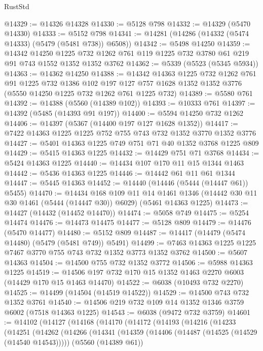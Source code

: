 \begin{lexlean}{RustStd}
\begin{coremodule}
@14329 := @14326 @14328
@14330 := @5128 @798
@14332 := @14329 (@5470 @14330)
@14333 := @5152 @798
@14341 := @14281 (@14286 (@14332 (@5474 @14333) (@5479 (@5481 @738)) @6508))
@14342 := @5498 @14250
@14359 := @14342
    @14250
    @1225
    @732
    @1262
    @761
    @119
    @1225
    @732
    @3780
    @61
    @219
    @91
    @743
    @1552
    @1352
    @1352
    @3762
@14362 := @5339 (@5523 (@5345 @5934))
@14363 := @14362 @14250
@14388 := @14342
    @14363
    @1225
    @732
    @1262
    @761
    @91
    @1225
    @732
    @1386
    @102
    @197
    @127
    @757
    @1628
    @1352
    @1352
    @3776
    (@5550 @14250 @1225 @732 @1262 @761 @1225 @732)
@14389 := @5580 @761
@14392 := @14388 (@5560 (@14389 @102))
@14393 := @10333 @761
@14397 := @14392 (@5485 (@14393 @91 @197))
@14400 := @5594 @14250 @732 @1262
@14406 := @14397 (@5367 (@14400 @197 @127 @1628 @1352))
@14417 := @7422 @14363 @1225 @1225 @752 @755 @743 @732 @1352 @3770 @1352 @3776
@14427 := @5401 @14363 @1225 @749 @751 @71 @40 @1352 @3768 @1225 @809
@14429 := @5415 @14363 @1225
@14432 := @14429 @751 @71 @3768
@14434 := @5424 @14363 @1225
@14440 := @14434 @107 @170 @11 @15 @1344 @1463
@14442 := @5436 @14363 @1225
@14446 := @14442 @61 @11 @61 @1344
@14447 := @5445 @14363
@14452 := @14440 (@14446 (@5444 (@14447 @61)) @5455)
@14470 := @14434
    @168
    @109
    @11
    @14
    @1461
    @1346
    (@14442 @30 @11 @30 @1461 (@5444 (@14447 @30)) @6029)
    (@5461 @14363 @1225)
@14473 := @14427 (@14432 (@14452 @14470))
@14474 := @5058 @749
@14475 := @5254 @14474
@14476 := @14473 @14475
@14477 := @5128 @809
@14479 := @14476 (@5470 @14477)
@14480 := @5152 @809
@14487 := @14417 (@14479 (@5474 @14480) (@5479 (@5481 @749)) @5491)
@14499 := @7463 @14363 @1225 @1225 @7467 @3770 @755 @743 @732 @1352 @3773 @1352 @3762
@14500 := @5607 @14363
@14504 := @14500 @755 @732 @1352 @3772
@14506 := @5988 @14363 @1225
@14519 := @14506 @197 @732 @170 @15 @1352 @1463 @2270 @6003 (@14429 @170 @15 @1463 @14470)
@14522 := @6038 (@10493 @732 @2270)
@14525 := @14499 (@14504 (@14519 @14522))
@14529 := @14500 @743 @732 @1352 @3761
@14540 := @14506 @219 @732 @109 @14 @1352 @1346 @3759 @6002 (@7518 @14363 @1225)
@14543 := @6038 (@9472 @732 @3759)
@14601 := @14102
    (@14127
      (@14168
        (@14170
          (@14172
            (@14193
              (@14216
                (@14233
                  (@14251
                    (@14262
                      (@14266
                        (@14341
                          (@14359
                            (@14406 (@14487 (@14525 (@14529 (@14540 @14543)))))
                            (@5560 (@14389 @61))

\end{coremodule}
\end{lexlean}
